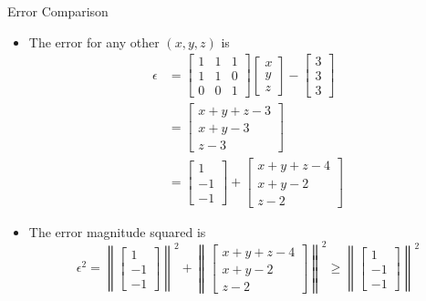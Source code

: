 \documentclass[usenames,dvipsnames,10pt]{beamer}
\begin{document}
\begin{frame}
  {Error Comparison}

  \begin{itemize}
  \item The error for any other $(x,y,z)$ is
    \begin{align*}
      \epsilon &= \begin{bmatrix} 1 & 1 & 1 \\ 1 & 1 & 0 \\ 0 & 0 & 1\end{bmatrix}\begin{bmatrix} x \\ y \\ z \end{bmatrix}
                 -\begin{bmatrix} 3 \\ 3 \\ 3 \end{bmatrix}\\
               &= \begin{bmatrix} x + y + z -3 \\ x + y - 3 \\ z - 3 \end{bmatrix}\\
               &= \begin{bmatrix} 1 \\ -1 \\ -1 \end{bmatrix}
                 + \begin{bmatrix} x+y+z-4 \\ x+y-2 \\ z -2 \end{bmatrix}
    \end{align*}
  \item The error magnitude squared is
    \[
      \epsilon^2 = \left\|\begin{bmatrix} 1 \\ -1 \\ -1 \end{bmatrix}\right\|^2
      + \left\|\begin{bmatrix} x+y+z-4 \\ x+y-2 \\ z -2 \end{bmatrix}\right\|^2
      \ge \left\|\begin{bmatrix} 1 \\ -1 \\ -1 \end{bmatrix}\right\|^2
    \]
  \end{itemize}
\end{frame}
\end{document}

